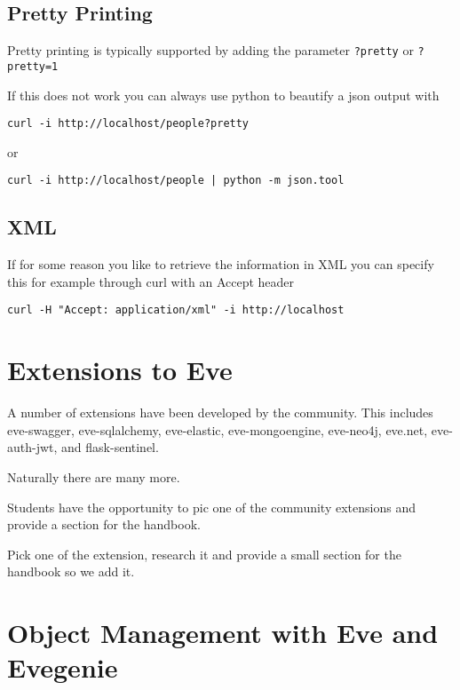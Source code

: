 \subsection{Pretty Printing}

Pretty printing is typically supported by adding the parameter
\verb|?pretty| or \verb|?pretty=1|

If this does not work you can always use python to beautify a json
output with 

\begin{lstlisting}
curl -i http://localhost/people?pretty
\end{lstlisting}

or

\begin{lstlisting}
curl -i http://localhost/people | python -m json.tool
\end{lstlisting}

\subsection{XML}

If for some reason you like to retrieve the information in XML you can
specify this for example through curl with an Accept header

\begin{lstlisting}
curl -H "Accept: application/xml" -i http://localhost
\end{lstlisting}

\section{Extensions to Eve}

A number of extensions have been developed by the community. This
includes
eve-swagger,
eve-sqlalchemy,
eve-elastic,
eve-mongoengine,
eve-neo4j,
eve.net,
eve-auth-jwt, and
flask-sentinel.

Naturally there are many more.

Students have the opportunity to pic one of the community extensions
and provide a section for the handbook.

\begin{exercise}
Pick one of the extension, research it and provide a small section for
the handbook so we add it.
\end{exercise}

\section{Object Management with Eve and Evegenie}

